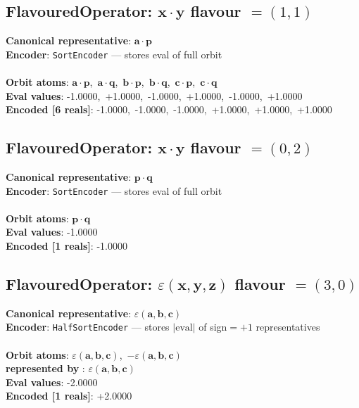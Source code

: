\documentclass[a4paper,11pt]{article}
\newcommand{\pdcegfomjfhook}[2]{\mathbf{#1} \cdot \mathbf{#2}}
\newcommand{\kblbmcpggoncpf}[3]{\varepsilon(\mathbf{#1},\mathbf{#2},\mathbf{#3})}
\begin{document}
\subsection{FlavouredOperator: $\pdcegfomjfhook{x}{y}$  flavour $= (1, 1)$}
\textbf{  Canonical representative}: $\displaystyle\pdcegfomjfhook{a}{p}$\\
\textbf{  Encoder}: \texttt{SortEncoder} — stores eval of full orbit\\\\
\textbf{  Orbit atoms}: $\pdcegfomjfhook{a}{p}$,\ $\pdcegfomjfhook{a}{q}$,\ $\pdcegfomjfhook{b}{p}$,\ $\pdcegfomjfhook{b}{q}$,\ $\pdcegfomjfhook{c}{p}$,\ $\pdcegfomjfhook{c}{q}$\\
\textbf{  Eval values}: -1.0000,\ +1.0000,\ -1.0000,\ +1.0000,\ -1.0000,\ +1.0000\\
\textbf{  Encoded [6 reals]}: -1.0000,\ -1.0000,\ -1.0000,\ +1.0000,\ +1.0000,\ +1.0000\\

\subsection{FlavouredOperator: $\pdcegfomjfhook{x}{y}$  flavour $= (0, 2)$}
\textbf{  Canonical representative}: $\displaystyle\pdcegfomjfhook{p}{q}$\\
\textbf{  Encoder}: \texttt{SortEncoder} — stores eval of full orbit\\\\
\textbf{  Orbit atoms}: $\pdcegfomjfhook{p}{q}$\\
\textbf{  Eval values}: -1.0000\\
\textbf{  Encoded [1 reals]}: -1.0000\\

\subsection{FlavouredOperator: $\kblbmcpggoncpf{x}{y}{z}$  flavour $= (3, 0)$}
\textbf{  Canonical representative}: $\displaystyle\kblbmcpggoncpf{a}{b}{c}$\\
\textbf{  Encoder}: \texttt{HalfSortEncoder} — stores $|\text{eval}|$ of sign$=+1$ representatives\\\\
\textbf{  Orbit atoms}: $\kblbmcpggoncpf{a}{b}{c}$,\ $-\kblbmcpggoncpf{a}{b}{c}$\\
\textbf{  represented by }: $\kblbmcpggoncpf{a}{b}{c}$\\
\textbf{  Eval values}: -2.0000\\
\textbf{  Encoded [1 reals]}: +2.0000\\
\end{document}
